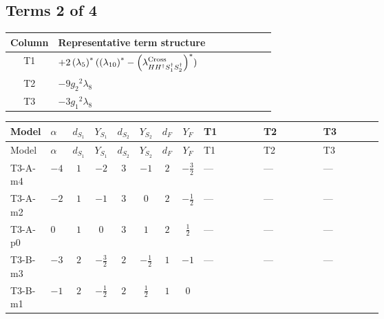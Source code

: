 \documentclass[8pt]{article}
\begin{document}
\begin{landscape}
\subsection*{Terms 2 of 4}
\begin{center}
\begin{tabular}{@{}c >{\raggedright\arraybackslash}p{0.82\linewidth}@{}}
\toprule
Column & Representative term structure \\
\midrule
T1 & \(\displaystyle +2 \left({\lambda_5}\right)^{*} (\left({\lambda_{10}}\right)^{*}-\left({\lambda_{H H^\dagger S_1^\dagger S_2^\dagger}^{\rm Cross}}\right)^{*})\) \\
\midrule
T2 & \(\displaystyle -9 {g_2}^2 {\lambda_{8}}\) \\
\midrule
T3 & \(\displaystyle -3 {g_1}^2 {\lambda_{8}}\) \\
\midrule
\bottomrule
\end{tabular}
\end{center}
\smallskip
\tiny
\begin{longtable}{@{}llcccccc >{\raggedright\arraybackslash}p{0.21\linewidth} >{\raggedright\arraybackslash}p{0.21\linewidth} >{\raggedright\arraybackslash}p{0.21\linewidth}@{}}
\toprule
Model & $\alpha$ & $d_{S_1}$ & $Y_{S_1}$ & $d_{S_2}$ & $Y_{S_2}$ & $d_F$ & $Y_F$ & T1 & T2 & T3 \\
\midrule
\endfirsthead
\toprule
Model & $\alpha$ & $d_{S_1}$ & $Y_{S_1}$ & $d_{S_2}$ & $Y_{S_2}$ & $d_F$ & $Y_F$ & T1 & T2 & T3 \\
\midrule
\endhead
T3-A-m4 & $-4$ & $1$ & $-2$ & $3$ & $-1$ & $2$ & $-\frac{3}{2}$ & --- & --- & --- \\
\midrule
T3-A-m2 & $-2$ & $1$ & $-1$ & $3$ & $0$ & $2$ & $-\frac{1}{2}$ & --- & --- & --- \\
\midrule
T3-A-p0 & $0$ & $1$ & $0$ & $3$ & $1$ & $2$ & $\frac{1}{2}$ & --- & --- & --- \\
\midrule
T3-B-m3 & $-3$ & $2$ & $-\frac{3}{2}$ & $2$ & $-\frac{1}{2}$ & $1$ & $-1$ & --- & --- & --- \\
\midrule
T3-B-m1 & $-1$ & $2$ & $-\frac{1}{2}$ & $2$ & $\frac{1}{2}$ & $1$ & $0$ & \scriptsize\adjustbox{max width=\linewidth}{$\begin{gathered} +2 \left({\lambda_5}\right)^{*} (\left({\lambda_{10}}\right)^{*}-\left({\lambda_{H H^\dagger S_1^\dagger S_2^\dagger}^{\rm Cross}}\right)^{*})\end{gathered}$} & \scriptsize\adjustbox{max width=\linewidth}{$\begin{gathered} -9 {g_2}^2 {\lambda_{8}}\end{gathered}$} & \scriptsize\adjustbox{max width=\linewidth}{$\begin{gathered} -3 {g_1}^2 {\lambda_{8}}\end{gathered}$} \\

\end{longtable}
\end{landscape}
\end{document}
